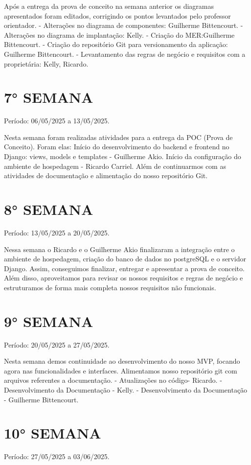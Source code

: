 \documentclass[
	12pt,				%
	openany,			%
	twoside,			%
	a4paper,			%
	english,			%
	french,				%
	spanish,			%
	brazil				%
	]{abntex2}
\begin{document}
\begin{apendicesenv}
Após a entrega da prova de conceito na semana anterior os diagramas apresentados foram editados, corrigindo os pontos levantados 
pelo professor orientador. 
- Alterações no diagrama de componentes: Guilherme Bittencourt.
- Alterações no diagrama de implantação: Kelly.
- Criação do MER:Guilherme Bittencourt.
- Criação do repositório Git para versionamento da aplicação: Guilherme Bittencourt.
- Levantamento das regras de negócio e requisitos com a proprietária:  Kelly, Ricardo.

\section{7° SEMANA}
Período: 06/05/2025 a 13/05/2025.

Nesta semana foram realizadas atividades para a entrega da POC (Prova de Conceito). Foram elas:
Início do desenvolvimento do backend e frontend no Django: views, models e templates - Guilherme Akio.
Início da configuração do ambiente de hospedagem - Ricardo Carriel.
Além de continuarmos com as atividades de documentação e alimentação do nosso repositório Git.

\section{8° SEMANA}
Período: 13/05/2025 a 20/05/2025.

Nessa semana o Ricardo e o Guilherme Akio finalizaram a integração entre o ambiente de hospedagem, criação do banco de dados no postgreSQL e o servidor Django. 
Assim, conseguimos finalizar, entregar e apresentar a prova de conceito. Além disso, aproveitamos para revisar os nossos requisitos e  regras de negócio e 
estruturamos de forma mais completa nossos requisitos não funcionais.

\section{9° SEMANA}
Período: 20/05/2025 a 27/05/2025.

Nesta semana demos continuidade ao desenvolvimento do nosso MVP, focando agora nas funcionalidades e interfaces. Alimentamos nosso repositório git com arquivos referentes a documentação.
- Atualizações no código- Ricardo.
- Desenvolvimento da Documentação - Kelly.
- Desenvolvimento da Documentação - Guilherme Bittencourt.

\section{10° SEMANA}
Período: 27/05/2025 a 03/06/2025.


\end{apendicesenv}
\end{document}
